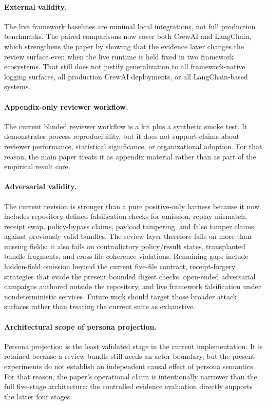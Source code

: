 \paragraph{External validity.}
The live framework baselines are minimal local integrations, not full production benchmarks. The paired comparisons now cover both CrewAI and LangChain, which strengthens the paper by showing that the evidence layer changes the review surface even when the live runtime is held fixed in two framework ecosystems. That still does not justify generalization to all framework-native logging surfaces, all production CrewAI deployments, or all LangChain-based systems.

\paragraph{Appendix-only reviewer workflow.}
The current blinded reviewer workflow is a kit plus a synthetic smoke test. It demonstrates process reproducibility, but it does not support claims about reviewer performance, statistical significance, or organizational adoption. For that reason, the main paper treats it as appendix material rather than as part of the empirical result core.

\paragraph{Adversarial validity.}
The current revision is stronger than a pure positive-only harness because it now includes repository-defined falsification checks for omission, replay mismatch, receipt swap, policy-bypass claims, payload tampering, and false tamper claims against previously valid bundles. The review layer therefore fails on more than missing fields: it also fails on contradictory policy/result states, transplanted bundle fragments, and cross-file coherence violations. Remaining gaps include hidden-field omission beyond the current five-file contract, receipt-forgery strategies that evade the present bounded digest checks, open-ended adversarial campaigns authored outside the repository, and live framework falsification under nondeterministic services. Future work should target those broader attack surfaces rather than treating the current suite as exhaustive.

\paragraph{Architectural scope of persona projection.}
Persona projection is the least validated stage in the current implementation. It is retained because a review bundle still needs an actor boundary, but the present experiments do not establish an independent causal effect of persona semantics. For that reason, the paper's operational claim is intentionally narrower than the full five-stage architecture: the controlled evidence evaluation directly supports the latter four stages.

